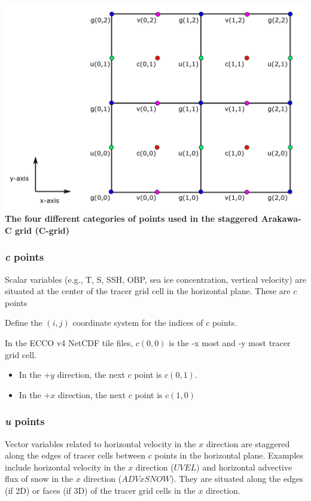 \documentclass[11pt]{article}
\makeatletter
\def\maxwidth{\ifdim\Gin@nat@width>\linewidth\linewidth
    \else\Gin@nat@width\fi}
\let\Oldincludegraphics\includegraphics
\renewcommand{\includegraphics}[1]{\Oldincludegraphics[width=.8\maxwidth]{#1}}
\providecommand{\tightlist}{%
      \setlength{\itemsep}{0pt}\setlength{\parskip}{0pt}}
\makeatother
\begin{document}
\includegraphics{../figures/C-grid-points.png} \textbf{The four
different categories of points used in the staggered Arakawa-C grid
(C-grid)}

\subsubsection{\texorpdfstring{\emph{c}
points}{c points}}\label{c-points}

Scalar variables (e.g., T, S, SSH, OBP, sea ice concentration, vertical
velocity) are situated at the center of the tracer grid cell in the
horizontal plane. These are \(c\) points

Define the \((i,j)\) coordinate system for the indices of \(c\) points.

In the ECCO v4 NetCDF tile files, \(c(0,0)\) is the -x most and -y most
tracer grid cell.

\begin{itemize}
\tightlist
\item
  In the +\(y\) direction, the next \(c\) point is \(c(0,1)\).
\item
  In the +\(x\) direction, the next \(c\) point is \(c(1,0)\)
\end{itemize}

\subsubsection{\texorpdfstring{\emph{u}
points}{u points}}\label{u-points}

Vector variables related to horizontal velocity in the \(x\) direction
are staggered along the edges of tracer cells between \(c\) points in
the horizontal plane. Examples include horizontal velocity in the \(x\)
direction (\(UVEL\)) and horizontal advective flux of snow in the \(x\)
direction (\(ADVxSNOW\)). They are situated along the edges (if 2D) or
faces (if 3D) of the tracer grid cells in the \(x\) direction.
\end{document}
